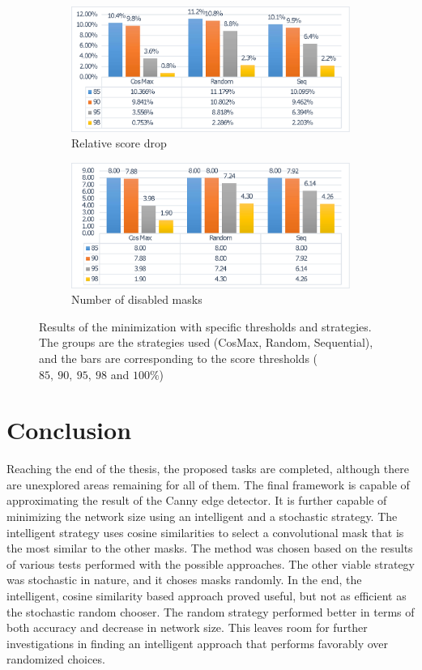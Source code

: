 \documentclass[12pt]{report}
\begin{document}
\begin{figure}
	\centering
	\begin{subfigure}[b]{\linewidth}
		\centering
		\includegraphics[width=0.9\linewidth]{dia/stat2.eps}
		\caption{Relative score drop}
	\end{subfigure}
	\begin{subfigure}[b]{\linewidth}
		\centering
		\includegraphics[width=0.9\linewidth]{dia/stat1.eps}
		\caption{Number of disabled masks}
	\end{subfigure}
	\caption{Results of the minimization with specific thresholds and strategies. The groups are the strategies used (CosMax, Random, Sequential), and the bars are corresponding to the score thresholds ($ 85,\ 90,\ 95,\ 98$ and $100\%$)}
	\label{fin}
\end{figure}

\chapter{Conclusion}
Reaching the end of the thesis, the proposed tasks are completed, although there are unexplored areas remaining for all of them. The final framework is capable of approximating the result of the Canny edge detector. It is further capable of minimizing the network size using an intelligent and a stochastic strategy. The intelligent strategy uses cosine similarities to select a convolutional mask that is the most similar to the other masks. The method was chosen based on the results of various tests performed with the possible approaches. The other viable strategy was stochastic in nature, and it choses masks randomly. In the end, the intelligent, cosine similarity based approach proved useful, but not as efficient as the stochastic random chooser. The random strategy performed better in terms of both accuracy and decrease in network size. This leaves room for further investigations in finding an intelligent approach that performs favorably over randomized choices.
\end{document}

